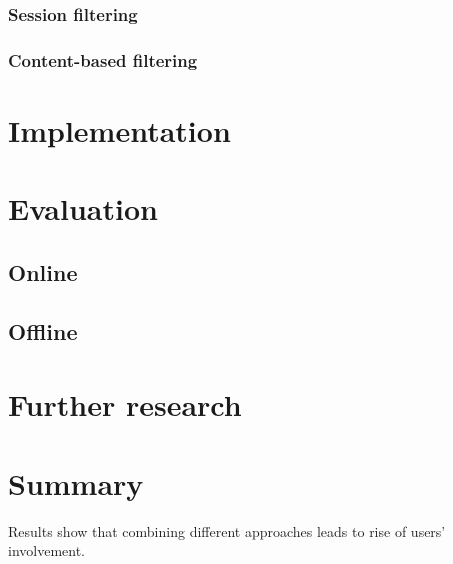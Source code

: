 \documentclass{article}
\begin{document}
    \subsubsection{Session filtering}

    \subsubsection{Content-based filtering}

    \section{Implementation}
    \label{sec:implementation}

    \section{Evaluation}
    \label{sec:evaluation}

    \subsection{Online}

    \subsection{Offline}

    \section{Further research}
    \label{sec:further}

    \section{Summary}
    \label{sec:summary}

        Results show that combining different approaches leads to rise of users' involvement.

        

    
      
\end{document}
